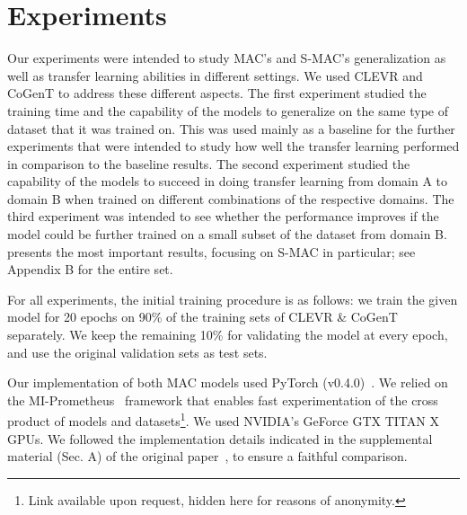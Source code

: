 \section{Experiments}

Our experiments were intended to study MAC's and S-MAC's generalization as well as transfer learning abilities in different settings. We used CLEVR and CoGenT to address these different aspects.
The first experiment studied the training time and the capability of the models to generalize on the same type of dataset that it was trained on. This was used mainly as a baseline for the further experiments that were intended to study how well the transfer learning performed in comparison to the baseline results.
The second experiment studied the capability of the models to succeed in doing transfer learning from domain A to domain B when trained on different combinations of the respective domains. The third experiment was intended to see whether the performance improves if the model could be further trained on a small subset of the dataset from domain B.
 presents the most important results, focusing on S-MAC in particular; see Appendix B for the entire set.

For all experiments, the initial training procedure is as follows: we train the given model  for 20 epochs on 90\% of the training sets of CLEVR \& CoGenT separately. We keep the remaining 10\% for validating the model at every epoch, and use the original validation sets as test sets.

Our implementation of both MAC models used PyTorch (v0.4.0)~\cite{paszke2017automatic}. We relied on the MI-Prometheus~\cite{kornuta2018accelerating} framework that enables fast experimentation of the cross product of models and datasets\footnote{Link available upon request, hidden here for reasons of anonymity.}. %
We used NVIDIA's GeForce GTX TITAN X GPUs. We followed the implementation details indicated in the supplemental material (Sec. A) of the original paper~\cite{hudson2018compositional}, to ensure a faithful comparison.


